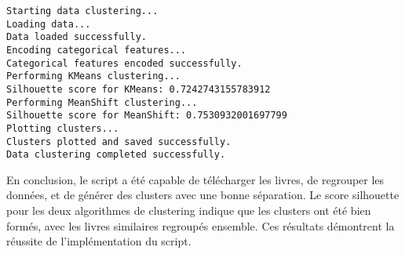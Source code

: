 \begin{verbatim}
Starting data clustering...
Loading data...
Data loaded successfully.
Encoding categorical features...
Categorical features encoded successfully.
Performing KMeans clustering...
Silhouette score for KMeans: 0.7242743155783912
Performing MeanShift clustering...
Silhouette score for MeanShift: 0.7530932001697799
Plotting clusters...
Clusters plotted and saved successfully.
Data clustering completed successfully.
\end{verbatim}

En conclusion, le script a été capable de télécharger les livres, de regrouper les données, et de générer des clusters avec une bonne séparation. Le score silhouette pour les deux algorithmes de clustering indique que les clusters ont été bien formés, avec les livres similaires regroupés ensemble. Ces résultats démontrent la réussite de l'implémentation du script.
